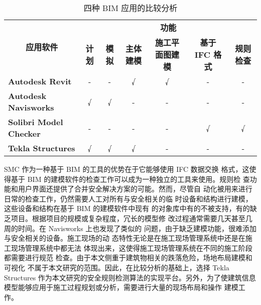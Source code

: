 \begin{table}[thbp]
    \caption{四种 BIM 应用的比较分析}
    \begin{center}
        \begin{tabular}{@{}lcccccc@{}}
            \toprule
            \multicolumn{1}{c}{\multirow{2}{*}{\textbf{应用软件}}} & \multicolumn{6}{c}{\textbf{功能}} \\ \cmidrule(l){2-7} 
            \multicolumn{1}{c}{} & \textbf{计划} & \textbf{模拟} & \textbf{主体建模} & \textbf{施工平面图建模} & \textbf{基于 IFC 格式} & \textbf{规则检查} \\ \midrule
            \textbf{Autodesk Revit} & - & - & √ & √ & - & - \\
            \textbf{Autodesk Navisworks} & √ & √ & - & - & - & - \\
            \textbf{Solibri Model Checker} & - & - & - & - & √ & √ \\
            \textbf{Tekla Structures} & √ & √ & √ & - & - & - \\ \bottomrule
            \end{tabular}
    \end{center}
    \label{tb:CP}
\end{table}
\newpage
SMC 作为一种基于 BIM 的工具的优势在于它能够使用 IFC 数据交换
格式，这使得基于 BIM 的建模软件的检查工作可以成为一种独立的工具来使用。规则检
查功能和用户界面还提供了合并安全解决方案的可能。然而，尽管自
动化被用来进行日常的检查工作，仍然需要人工对所有与安全相关的临
时设备和结构进行建模，这些设备和结构在基于 BIM 的建模软件中现有
的对象库中有的不被支持，有的缺乏项目。根据项目的规模或复杂程度，冗长的模型修
改过程通常需要几天甚至几周的时间。在 Navisworks 上也发现了类似的
问题，由于缺乏建模功能，很难添加与安全相关的设备。施工现场的动
态特性无论是在施工现场管理系统中还是在施工现场管理系统中都无法
体现出来，这使得施工现场管理系统在不同的施工阶段都需要进行规范
检查。由于本文侧重于建筑物相关的跌落危险，场地布局建模和可视化
不属于本文研究的范围。因此，在比较分析的基础上，选择 Tekla Structures
作为本文研究的安全规则检测算法的实现平台。另外，为了使建筑信息
模型能够应用于施工过程规划或分析，需要进行大量的现场布局和操作
建模工作。
